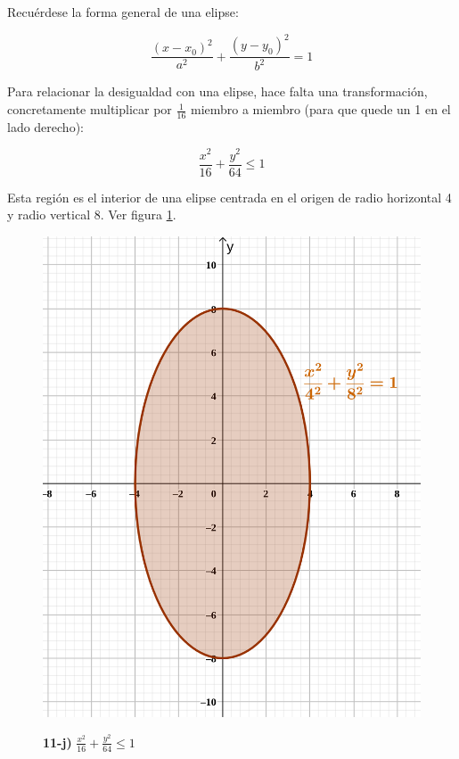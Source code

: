 \documentclass{article}
\begin{document}
Recuérdese la forma general de una elipse:

\begin{equation}
\frac{(x-x_0)^2}{a^2} + \frac{(y-y_0)^2}{b^2} = 1
\end{equation}

Para relacionar la desigualdad con una elipse, hace falta una transformación, concretamente multiplicar por $\frac{1}{16}$ miembro a miembro (para que quede un 1 en el lado derecho):

\begin{equation}
\frac{x^2}{16} + \frac{y^2}{64} \leq 1
\end{equation}

Esta región es el interior de una elipse centrada en el origen de radio horizontal 4 y radio vertical 8. Ver figura \ref{fig:1-11-j}.

\begin{figure}[ht]
\caption{\textbf{11-j)} $\frac{x^2}{16} + \frac{y^2}{64} \leq 1$}
\includegraphics[scale=0.3]{img/ejercicios/1/11-j.png} 
\centering
\label{fig:1-11-j}
\end{figure}
\end{document}
